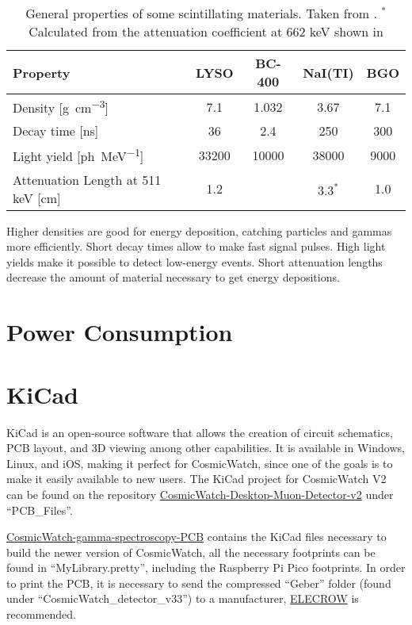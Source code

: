 \begin{table}[htb]
  \caption{General properties of some scintillating materials. Taken from \cite{mukhopadhyay2004plastic,Luxium_LYSO,Luxium_plastic,SaintGobain_NaI}. $^*$Calculated from the attenuation coefficient at 662 \unit{\kilo\eV} shown in \cite[p.~3]{SaintGobain_NaI}}
  \centering
  \begin{tabular}{ l c c c c}
    \midrule
    Property & LYSO & BC-400 & NaI(TI) & BGO\\
    \midrule
    Density [\unit{\g\per\cm\cubed}] & 7.1 & 1.032 & 3.67 & 7.1\\
    Decay time [\unit{\nano\s}]  & 36 & 2.4 & 250 & 300\\
    Light yield [\unit{ph\per\mega\eV}] & 33200 & 10000 & 38000 & 9000\\
    Attenuation Length at 511 \unit{\kilo\eV} [\unit{\cm}] & 1.2 &  & $3.3^{*}$ & 1.0\\
    \bottomrule
  \end{tabular}
  \label{tab:scintillators}
\end{table}

Higher densities are good for energy deposition, catching particles and gammas more efficiently. Short decay times allow to make fast signal pulses. High light yields make it possible to detect low-energy events. Short attenuation lengths decrease the amount of material necessary to get energy depositions.

\section{Power Consumption}

\section{KiCad}

KiCad is an open-source software that allows the creation of circuit schematics, PCB layout, and 3D viewing among other capabilities. It is available in Windows, Linux, and iOS, making it perfect for CosmicWatch, since one of the goals is to make it easily available to new users. The KiCad project for CosmicWatch V2 can be found on the repository \href{https://github.com/spenceraxani/CosmicWatch-Desktop-Muon-Detector-v2}{CosmicWatch-Desktop-Muon-Detector-v2} under ``PCB\_Files''.

\href{https://github.com/anvargasl/CosmicWatch-gamma-spectroscopy-PCB}{CosmicWatch-gamma-spectroscopy-PCB} contains the KiCad files necessary to build the newer version of CosmicWatch, all the necessary footprints can be found in ``MyLibrary.pretty'', including the Raspberry Pi Pico footprints. In order to print the PCB, it is necessary to send the compressed ``Geber'' folder (found under ``CosmicWatch\_detector\_v33'') to a manufacturer, \href{https://www.elecrow.com/pcb-manufacturing.html}{ELECROW} is recommended.

